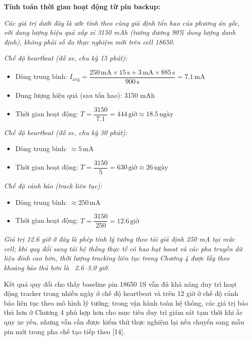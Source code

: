 \documentclass[a4paper]{extarticle}
\providecommand{\tightlist}{%
  \setlength{\itemsep}{0pt}\setlength{\parskip}{0pt}}
\begin{document}
\textbf{Tính toán thời gian hoạt động từ pin backup:}

\emph{Các giá trị dưới đây là ước tính theo cùng giả định tổn hao của
phương án gốc, với dung lượng hiệu quả xấp xỉ 3150 mAh (tương đương 90\%
dung lượng danh định), không phải số đo thực nghiệm mới trên cell
18650.}

\emph{Chế độ heartbeat (đỗ xe, chu kỳ 15 phút):}

\begin{itemize}
\tightlist
\item
  Dòng trung bình:
  \(I_{\text{avg}} = \dfrac{250\,\mathrm{mA}\times 15\,\mathrm{s} + 3\,\mathrm{mA}\times 885\,\mathrm{s}}{900\,\mathrm{s}} = 7.1\,\mathrm{mA}\)
\item
  Dung lượng hiệu quả (sau tổn hao): 3150 mAh
\item
  Thời gian hoạt động:
  \(T = \dfrac{3150}{7.1} = 444\,\mathrm{giờ} \approx 18.5\,\text{ngày}\)
\end{itemize}

\emph{Chế độ heartbeat (đỗ xe, chu kỳ 30 phút):}

\begin{itemize}
\tightlist
\item
  Dòng trung bình: \(\approx 5\,\mathrm{mA}\)
\item
  Thời gian hoạt động:
  \(T = \dfrac{3150}{5} = 630\,\mathrm{giờ} \approx 26\,\text{ngày}\)
\end{itemize}

\emph{Chế độ cảnh báo (track liên tục):}

\begin{itemize}
\tightlist
\item
  Dòng trung bình: \(\approx 250\,\mathrm{mA}\)
\item
  Thời gian hoạt động:
  \(T = \dfrac{3150}{250} = 12.6\,\mathrm{giờ}\)
\end{itemize}

\emph{Giá trị 12.6 giờ ở đây là phép tính lý tưởng theo tải giả định 250
mA tại mức cell; khi quy đổi sang tải hệ thống thực tế có hao hụt boost
và các pha truyền dữ liệu đỉnh cao hơn, thời lượng tracking liên tục
trong Chương 4 được lấy theo khoảng bảo thủ hơn là
~2.6--3.0 giờ.}

Kết quả quy đổi cho thấy baseline pin 18650 1S vẫn đủ khả năng duy trì
hoạt động tracker trong nhiều ngày ở chế độ heartbeat và trên 12 giờ ở
chế độ cảnh báo liên tục theo mô hình lý tưởng; trong vận hành toàn hệ
thống, các giá trị bảo thủ hơn ở Chương 4 phù hợp hơn cho mục tiêu duy
trì giám sát tạm thời khi ắc quy xe yếu, nhưng vẫn cần được kiểm thử
thực nghiệm lại nếu chuyển sang mẫu pin mới trong pha chế tạo tiếp theo
{[}14{]}.
\end{document}
